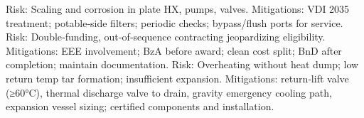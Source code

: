 {}\markdownRendererUlBeginTight
\markdownRendererUlItem Risk: Scaling and corrosion in plate HX, pumps, valves.\markdownRendererUlItemEnd 
\markdownRendererUlItem Mitigations: VDI 2035 treatment; potable‑side filters; periodic checks; bypass/flush ports for service.\markdownRendererUlItemEnd 
\markdownRendererUlEndTight \markdownRendererInterblockSeparator
{}
\markdownRendererSectionEnd \markdownRendererSectionBegin
{}\markdownRendererInterblockSeparator
{}\markdownRendererUlBeginTight
\markdownRendererUlItem Risk: Double‑funding, out‑of‑sequence contracting jeopardizing eligibility.\markdownRendererUlItemEnd 
\markdownRendererUlItem Mitigations: EEE involvement; BzA before award; clean cost split; BnD after completion; maintain documentation.\markdownRendererUlItemEnd 
\markdownRendererUlEndTight \markdownRendererInterblockSeparator
{}
\markdownRendererSectionEnd \markdownRendererSectionBegin
{}\markdownRendererInterblockSeparator
{}\markdownRendererUlBeginTight
\markdownRendererUlItem Risk: Overheating without heat dump; low return temp tar formation; insufficient expansion.\markdownRendererUlItemEnd 
\markdownRendererUlItem Mitigations: return‑lift valve (≥60°C), thermal discharge valve to drain, gravity emergency cooling path, expansion vessel sizing; certified components and installation.\markdownRendererUlItemEnd 
\markdownRendererUlEndTight 
\markdownRendererSectionEnd 
\markdownRendererSectionEnd \markdownRendererDocumentEnd